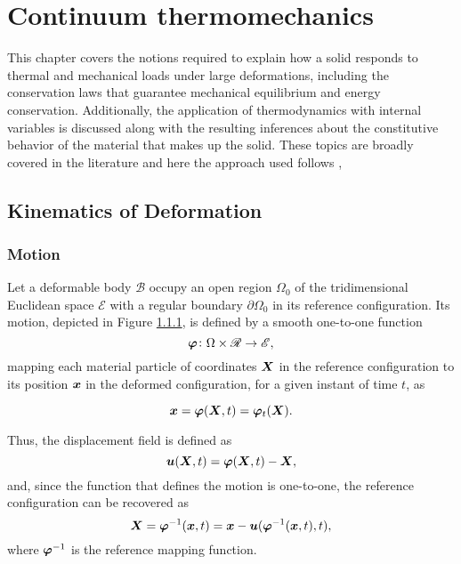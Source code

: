 \chapter{Continuum thermomechanics} \label{ch:continuum_mechanics}

This chapter covers the notions required to explain how a solid responds to thermal and mechanical loads under large deformations, including the conservation laws that guarantee mechanical equilibrium and energy conservation.
Additionally, the application of thermodynamics with internal variables is discussed along with the resulting inferences about the constitutive behavior of the material that makes up the solid.
These topics are broadly covered in the literature and here the approach used follows \cite{de_souza_neto_computational_2008},

\section{Kinematics of Deformation}

\subsection{Motion}

Let a deformable body $\mathscr{B}$ occupy an open region $\Omega_0$ of the tridimensional Euclidean space $\mathscr{E}$ with a regular boundary $\partial \Omega_0$ in its reference configuration.
Its motion, depicted in Figure \ref{}, is defined by a smooth one-to-one function
\begin{equation}
    \bm{\varphi}\colon \Omega\times \mathscr{R}\to \mathscr{E},
\end{equation}
mapping each material particle of coordinates $\bm{X}$ in the reference configuration to its position $\bm{x}$ in the deformed configuration, for a given instant of time $t$, as
\begin{highlight}
    \begin{equation}
        \bm{x} = \bm{\varphi}(\bm{X}, t)=\bm \varphi_t(\bm X).
    \end{equation}
\end{highlight}

\enlargethispage{\baselineskip}
Thus, the displacement field is defined as
\begin{equation}
    \bm{u}(\bm{X}, t) = \bm{\varphi}(\bm{X}, t) - \bm{X},
\end{equation}
and, since the function that defines the motion is one-to-one, the reference configuration can be recovered as
\begin{equation}
    \bm{X} = \bm{\varphi}^{-1} (\bm{x}, t) = \bm{x} - \bm{u}(\bm{\varphi}^{-1}(\bm{x}, t),t),
\end{equation}
where $\bm{\varphi}^{-1}$ is the reference mapping function.

